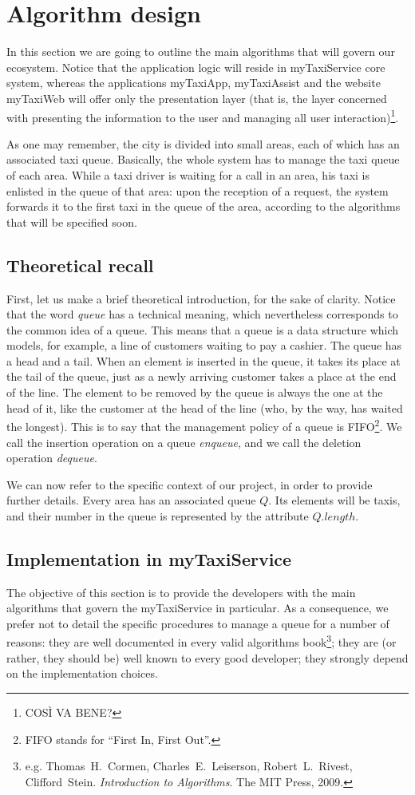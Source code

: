 \chapter{Algorithm design} \label{chap:algorithm}
In this section we are going to outline the main algorithms that will govern our ecosystem. Notice that the application logic will reside in myTaxiService core system, whereas the applications myTaxiApp, myTaxiAssist and the website myTaxiWeb will offer only the presentation layer (that is, the layer concerned with presenting the information to the user and managing all user interaction)\footnote{COS\`I VA BENE?}. %

As one may remember, the city is divided into small areas, each of which has an associated taxi queue. Basically, the whole system has to manage the taxi queue of each area. While a taxi driver is waiting for a call in an area, his taxi is enlisted in the queue of that area: upon the reception of a request, the system forwards it to the first taxi in the queue of the area, according to the algorithms that will be specified soon.


\section{Theoretical recall}
First, let us make a brief theoretical introduction, for the sake of clarity. Notice that the word \emph{queue} has a technical meaning, which nevertheless corresponds to the common idea of a queue. This means that a queue is a data structure which models, for example, a line of customers waiting to pay a cashier. The queue has a head and a tail. When an element is inserted in the queue, it takes its place at the tail of the queue, just as a newly arriving customer takes a place at the end of the line. The element to be removed by the queue is always the one at the head of it, like the customer at the head of the line (who, by the way, has waited the longest). This is to say that the management policy of a queue is FIFO\footnote{FIFO stands for ``First In, First Out''.}. We call the insertion operation on a queue \emph{enqueue}, and we call the deletion operation \emph{dequeue}.

We can now refer to the specific context of our project, in order to provide further details. Every area has an associated queue $Q$. Its elements will be taxis, and their number in the queue is represented by the attribute $Q.length$.


\section{Implementation in myTaxiService}
The objective of this section is to provide the developers with the main algorithms that govern the myTaxiService in particular. As a consequence, we prefer not to detail the  specific procedures to manage a queue for a number of reasons: they are well documented in every valid algorithms book\footnote{e.g. Thomas~H.~Cormen, Charles~E.~Leiserson, Robert~L.~Rivest, Clifford~Stein. \emph{Introduction to Algorithms}. The MIT Press, 2009.}; they are (or rather, they should be) well known to every good developer; they strongly depend on the implementation choices. 

